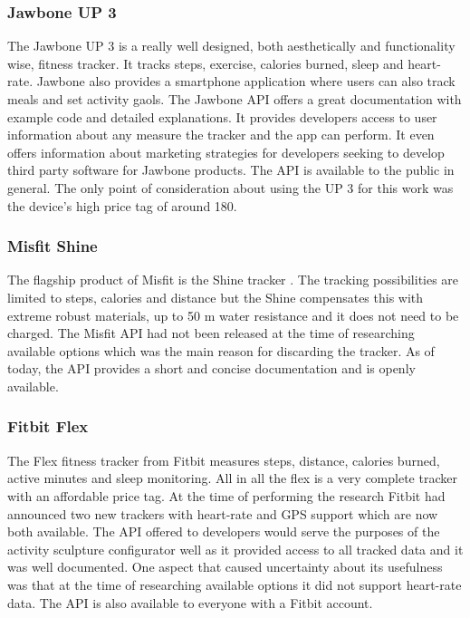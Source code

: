 \documentclass[../medieninformatik-arbeit.tex]{subfiles}
\begin{document}
\subsubsection*{Jawbone UP 3}
The Jawbone UP 3 \cite{jawboneUpProduct} is a really well designed, both aesthetically and functionality wise, fitness tracker. It tracks steps, exercise, calories burned, sleep and heart-rate. Jawbone also provides a smartphone application where users can also track meals and set activity gaols. The Jawbone API \cite{jawboneUpApi} offers a great documentation with example code and detailed explanations. It provides developers access to user information about any measure the tracker and the app can perform. It even offers information about marketing strategies for developers seeking to develop third party software for Jawbone products. The API is available to the public in general. The only point of consideration about using the UP 3 for this work was the device's high price tag of around \EUR{}180. 

\subsubsection*{Misfit Shine}
The flagship product of Misfit is the Shine tracker \cite{misfitShine}. The tracking possibilities are limited to steps, calories and distance but the Shine compensates this with extreme robust materials, up to 50 m water resistance and it does not need to be charged. The Misfit API \cite{misfitApi} had not been released at the time of researching available options which was the main reason for discarding the tracker. As of today, the API provides a short and concise documentation and is openly available. 

\subsubsection*{Fitbit Flex}
The Flex fitness tracker from Fitbit \cite{fitbitProduct} measures steps, distance, calories burned, active minutes and sleep monitoring. All in all the flex is a very complete tracker with an affordable price tag. At the time of performing the research Fitbit had announced two new trackers with heart-rate and GPS support which are now both available. The API offered to developers \cite{fitbitApi} would serve the purposes of the activity sculpture configurator well as it provided access to all tracked data and it was well documented. One aspect that caused uncertainty about its usefulness was that at the time of researching available options it did not support heart-rate data. The API is also available to everyone with a Fitbit account.
\end{document}
